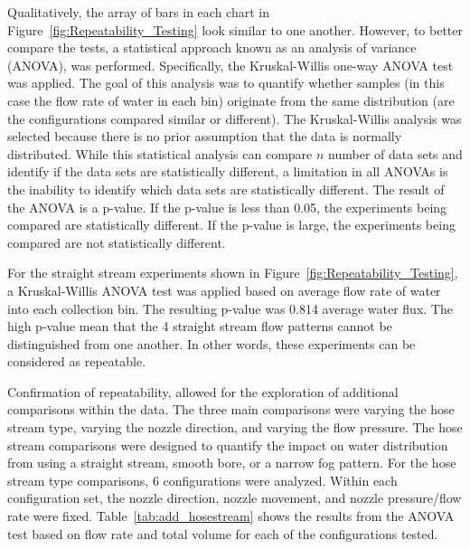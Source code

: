 \documentclass{book}
\begin{document}
Qualitatively, the array of bars in each chart in Figure~\ref{fig:Repeatability_Testing} look similar to one another. However, to better compare the tests, a statistical approach known as an analysis of variance (ANOVA), was performed. Specifically, the Kruskal-Willis one-way ANOVA test was applied. The goal of this analysis was to quantify whether samples (in this case the flow rate of water in each bin) originate from the same distribution (are the configurations compared similar or different). The Kruskal-Willis analysis was selected because there is no prior assumption that the data is normally distributed. While this statistical analysis can compare $n$ number of data sets and identify if the data sets are statistically different, a limitation in all ANOVAs is the inability to identify which data sets are statistically different. The result of the ANOVA is a p-value. If the p-value is less than 0.05, the experiments being compared are statistically different. If the p-value is large, the experiments being compared are not statistically different.

For the straight stream experiments shown in Figure~\ref{fig:Repeatability_Testing}, a Kruskal-Willis ANOVA test was applied based on average flow rate of water into each collection bin. The resulting p-value was 0.814 average water flux. The high p-value mean that the 4 straight stream flow patterns cannot be distinguished from one another. In other words, these experiments can be considered as repeatable.

Confirmation of repeatability, allowed for the exploration of additional comparisons within the data. The three main comparisons were varying the hose stream type, varying the nozzle direction, and varying the flow pressure. The hose stream comparisons were designed to quantify the impact on water distribution from using a straight stream, smooth bore, or a narrow fog pattern. For the hose stream type comparisons, 6 configurations were analyzed. Within each configuration set, the nozzle direction, nozzle movement, and nozzle pressure/flow rate were fixed. Table~\ref{tab:add_hosestream} shows the results from the ANOVA test based on flow rate and total volume for each of the configurations tested.
\end{document}
